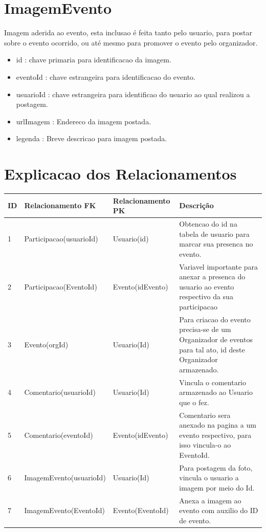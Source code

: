 \section{ImagemEvento}
Imagem aderida ao evento, esta inclusao é feita tanto pelo usuario, para postar sobre o evento ocorrido, ou até mesmo para promover o evento pelo organizador.

\begin{itemize}
    \item id : chave primaria para identificacao da imagem.
    \item eventoId : chave estrangeira para identificacao do evento.
    \item usuarioId : chave estrangeira para identificao do usuario ao qual realizou a postagem.
    \item urlImagem : Endereco da imagem postada.
    \item legenda : Breve descricao para imagem postada.
\end{itemize}

\section{Explicacao dos Relacionamentos}
\begin{tabular}{>{\raggedright}p{1.5cm}>{\raggedright}p{4cm}>{\raggedright}p{4cm}>{\raggedright}p{6cm}}
\toprule
  \textbf{ID} & \textbf{Relacionamento FK} &\textbf{Relacionamento PK} & \textbf{Descrição}  \tabularnewline 
\midrule
  1 & Participacao(usuarioId) & Usuario(id) & Obtencao do id na tabela de usuario para marcar sua presenca no evento. 
  \tabularnewline \hline
  2 & Participacao(EventoId) & Evento(idEvento) & Variavel importante para anexar a presenca do usuario ao evento respectivo da sua participacao
  \tabularnewline \hline
  3 & Evento(orgId) & Usuario(Id) & Para criacao do evento precisa-se de um Organizador de eventos para tal ato, id deste Organizador armazenado. \tabularnewline \hline
  4 & Comentario(usuarioId)& Usuario(Id) & Vincula o comentario armazenado ao Usuario que o fez. 
  \tabularnewline \hline
  5 & Comentario(eventoId) & Evento(idEvento) & Comentario sera anexado na pagina a um evento respectivo, para isso vincula-o ao EventoId. \tabularnewline \hline
  6 & ImagemEvento(usuarioId) & Usuario(Id) & Para postagem da foto, vincula o usuario a imagem por meio do Id. 
  \tabularnewline \hline
  7 & ImagemEvento(EventoId) & Evento(EventoId) & Anexa a imagem ao evento com auxilio do ID de evento.
  \tabularnewline \hline
\bottomrule
\end{tabular}

